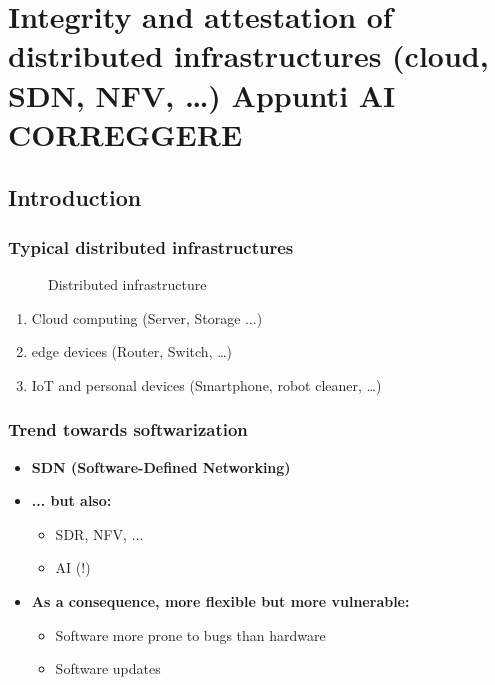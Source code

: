 \chapter{Integrity and attestation of distributed infrastructures (cloud, SDN, NFV, …) \textbf{Appunti AI CORREGGERE}}

\section{Introduction}

\subsection{Typical distributed infrastructures}

\begin{figure}[h]
    \centering
    \caption{Distributed infrastructure}
    \label{fig:distributed_infrastructure}
\end{figure}


\begin{enumerate}[itemsep=0pt]
    \item Cloud computing (Server, Storage ...)
    \item edge devices (Router, Switch, \dots)
    \item IoT and personal devices (Smartphone, robot cleaner,  \dots)
\end{enumerate}

\subsection{Trend towards softwarization}
\begin{itemize}[itemsep=0pt]
    \item \textbf{SDN (Software-Defined Networking)}
    \item \textbf{... but also:}
    \begin{itemize}[itemsep=0pt]
        \item SDR, NFV, ...
        \item AI (!)
    \end{itemize}
    \item \textbf{As a consequence, more flexible but more vulnerable:}
    \begin{itemize}[itemsep=0pt]
        \item Software more prone to bugs than hardware
        \item Software updates
    \end{itemize}
\end{itemize}

